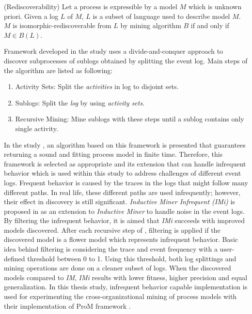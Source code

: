 \theoremstyle{definition}
\begin{definition}{}
(Rediscoverability) Let a process is expressible by a model $M$ which is unknown priori. Given a log $L$ of $M$, $L$ is a subset of language used to describe model $M$. $M$ is isomorphic-rediscoverable from $L$ by mining algorithm $B$ if and only if $M \in B(L)$.
\end{definition}
 
Framework developed in the study \cite{leemans2013discovering} uses a divide-and-conquer approach to discover subprocesses of sublogs obtained by splitting the event log. Main steps of the algorithm are listed as following:
\begin{enumerate}
  \item Activity Sets: Split the \textit{activities} in log to disjoint sets.
  \item Sublogs: Split the \textit{log} by using \textit{activity sets}.
  \item Recursive Mining: Mine sublogs with these steps until a sublog contains only single activity.
\end{enumerate}

In the study \cite{leemans2013discovering}, an algorithm based on this framework is presented that guarantees returning a sound and fitting process model in finite time. Therefore, this framework is selected as appropriate and its extension that can handle infrequent behavior which is used within this study to address challenges of different event logs. Frequent behavior is caused by the traces in the logs that might follow many different paths. In real life, these different paths are used infrequently; however, their effect in discovery is still significant. \textit{Inductive Miner Infrequent (IMi)} is proposed in \cite{leemans2014discoveringinfrequent} as an extension to \textit{Inductive Miner} to handle noise in the event logs. By filtering the infrequent behavior, it is aimed that \textit{IMi} succeeds with improved models discovered. After each recursive step of , filtering is applied if the discovered model is a flower model which represents infrequent behavior. Basic idea behind filtering is considering the trace and event frequency with a user-defined threshold between 0 to 1. Using this threshold, both log splittings and mining operations are done on a cleaner subset of logs. When the discovered models compared to \textit{IM}, \textit{IMi} results with lower fitness, higher precision and equal generalization.
In this thesis study, infrequent behavior capable implementation is used for experimenting the cross-organizational mining of process models with their implementation of ProM framework \cite{verbeek2010prom}.

